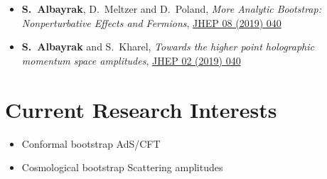 \documentclass[a4paper,11pt]{article}
\begin{document}
\begin{itemize}
 \item[] {\bf S.~Albayrak}, D.~Meltzer and  { D.~Poland}, \emph{More Analytic Bootstrap: Nonperturbative Effects and Fermions}, \hyperref{https://inspirehep.net/files/3a3c45b7b08a2948ba1c165463f00fd0}{category}{name}{JHEP 08 (2019) 040}
 
 \item[] {\bf S.~Albayrak} and  { S.~Kharel}, \emph{Towards the higher point holographic momentum space amplitudes}, \hyperref{https://inspirehep.net/files/fdfe40b4cfec540b04df94d4cb9bc1c4}{category}{name}{JHEP 02 (2019) 040}
 \end{itemize}


\section{\textcolor{burntorange}{Current Research Interests}}
\begin{itemize}[noitemsep,nolistsep] 
	\item[] Conformal bootstrap\hspace*{13.2em} AdS/CFT
	\item[] Cosmological bootstrap\hspace*{12em} Scattering amplitudes
\end{itemize}
\end{document}
